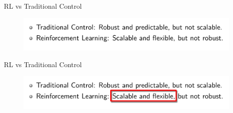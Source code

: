 \begin{frame}{RL vs Traditional Control}
    \begin{figure}
        \centering
        \includegraphics[width=\textwidth]{img/rl_vs_oc.png}
      \end{figure}
\end{frame}
\begin{frame}{RL vs Traditional Control}

    \begin{figure}
        \centering
        \includegraphics[width=\textwidth]{img/rl_vs_oc_annotated.png}
      \end{figure}
\end{frame}
